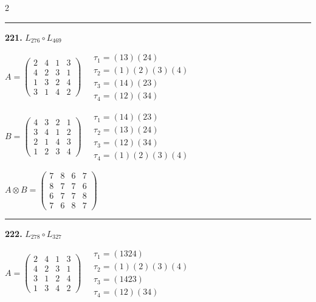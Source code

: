 \begin{multicols}{2}
\vspace{0.3em}
\hrule
\vspace{0.3em}

\noindent\textbf{221.} $L_{276} \circ L_{469}$

$A = \begin{pmatrix} 2 & 4 & 1 & 3 \\ 4 & 2 & 3 & 1 \\ 1 & 3 & 2 & 4 \\ 3 & 1 & 4 & 2 \end{pmatrix} \quad \begin{matrix} \tau_{1}=(1 3)(2 4) \\ \tau_{2}=(1)(2)(3)(4) \\ \tau_{3}=(1 4)(2 3) \\ \tau_{4}=(1 2)(3 4) \end{matrix}$

$B = \begin{pmatrix} 4 & 3 & 2 & 1 \\ 3 & 4 & 1 & 2 \\ 2 & 1 & 4 & 3 \\ 1 & 2 & 3 & 4 \end{pmatrix} \quad \begin{matrix} \tau_{1}=(1 4)(2 3) \\ \tau_{2}=(1 3)(2 4) \\ \tau_{3}=(1 2)(3 4) \\ \tau_{4}=(1)(2)(3)(4) \end{matrix}$

$A \otimes B = \begin{pmatrix} 7 & 8 & 6 & 7 \\ 8 & 7 & 7 & 6 \\ 6 & 7 & 7 & 8 \\ 7 & 6 & 8 & 7 \end{pmatrix}$

\vspace{0.3em}
\hrule
\vspace{0.3em}

\noindent\textbf{222.} $L_{278} \circ L_{327}$

$A = \begin{pmatrix} 2 & 4 & 1 & 3 \\ 4 & 2 & 3 & 1 \\ 3 & 1 & 2 & 4 \\ 1 & 3 & 4 & 2 \end{pmatrix} \quad \begin{matrix} \tau_{1}=(1 3 2 4) \\ \tau_{2}=(1)(2)(3)(4) \\ \tau_{3}=(1 4 2 3) \\ \tau_{4}=(1 2)(3 4) \end{matrix}$


\end{multicols}
